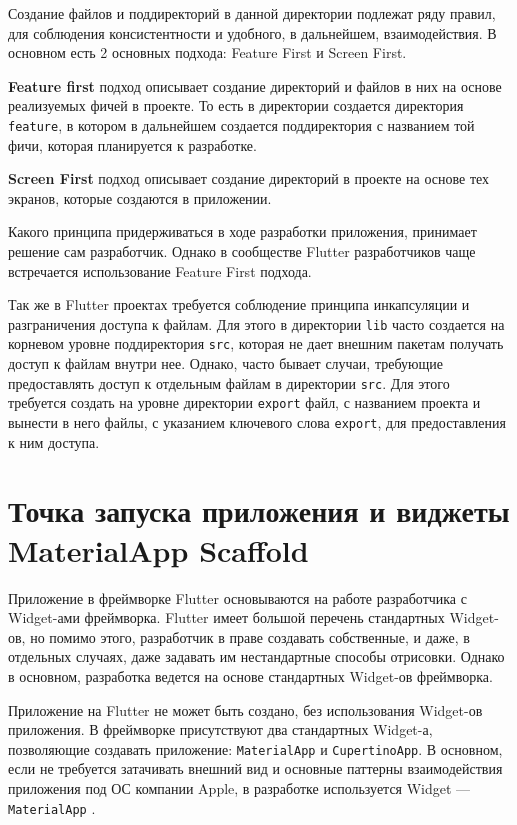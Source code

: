 Создание файлов и поддиректорий в данной директории подлежат ряду правил,
для соблюдения консистентности и удобного, в дальнейшем, взаимодействия.
В основном есть 2 основных подхода: Feature First и Screen First.\par
\textbf{Feature first} подход описывает создание директорий
и файлов в них на основе реализуемых фичей в проекте.
То есть в директории создается директория \texttt{feature},
в котором в дальнейшем создается поддиректория с названием той фичи,
которая планируется к разработке.\par
\textbf{Screen First} подход описывает создание директорий
в проекте на основе тех экранов, которые создаются в приложении.\par
Какого принципа придерживаться в ходе разработки приложения,
принимает решение сам разработчик.
Однако в сообществе Flutter разработчиков чаще
встречается использование Feature First подхода.\par
Так же в Flutter проектах требуется соблюдение принципа инкапсуляции
и разграничения доступа к файлам.
Для этого в директории \texttt{lib} часто создается
на корневом уровне поддиректория \texttt{src},
которая не дает внешним пакетам получать доступ к файлам внутри нее.
Однако, часто бывает случаи, требующие предоставлять доступ
к отдельным файлам в директории \texttt{src}.
Для этого требуется создать на уровне директории \texttt{export} файл,
с названием проекта и вынести в него файлы,
с указанием ключевого слова \texttt{export}, для предоставления к ним доступа.

\section{Точка запуска приложения и виджеты MaterialApp Scaffold}

Приложение в фреймворке Flutter основываются на работе разработчика
с Widget-ами фреймворка. Flutter имеет большой перечень стандартных Widget-ов,
но помимо этого, разработчик в праве создавать собственные,
и даже, в отдельных случаях, даже задавать им нестандартные способы отрисовки.
Однако в основном, разработка ведется на основе
стандартных Widget-ов фреймворка.\par
Приложение на Flutter не может быть создано,
без использования Widget-ов приложения.
В фреймворке присутствуют два стандартных Widget-а,
позволяющие создавать приложение: \texttt{MaterialApp} и \texttt{CupertinoApp}.
В основном, если не требуется затачивать внешний вид
и основные паттерны взаимодействия приложения под ОС компании Apple,
в разработке используется Widget --- \texttt{MaterialApp}
.

